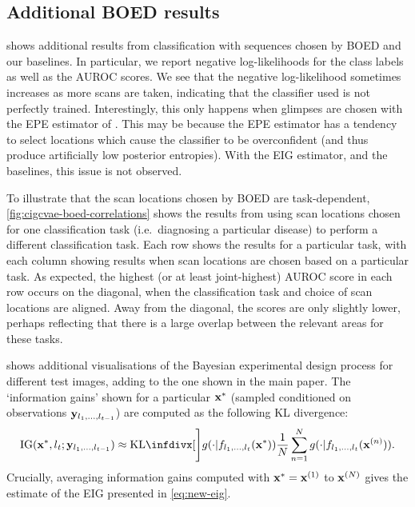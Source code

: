 \subsection{Additional BOED results} \label{supp:cigcvae-boed-results}
 shows additional results from classification with
sequences chosen by BOED and our baselines. In particular, we report negative
log-likelihoods for the class labels as well as the AUROC scores. We see that
the negative log-likelihood sometimes increases as more scans are taken,
indicating that the classifier used is not perfectly trained. Interestingly,
this only happens when glimpses are chosen with the EPE estimator of
\citet{harvey2019near}. This may be because the EPE estimator has a tendency to
select locations which cause the classifier to be overconfident (and thus
produce artificially low posterior entropies). With the EIG estimator, and the
baselines, this issue is not observed.

To illustrate that the scan locations chosen by BOED are task-dependent,
\cref{fig:cigcvae-boed-correlations} shows the results from using scan locations chosen
for one classification task (i.e.~diagnosing a particular disease) to perform a
different classification task. Each row shows the results for a particular task,
with each column showing results when scan locations are chosen based on a
particular task. As expected, the highest (or at least joint-highest) AUROC
score in each row occurs on the diagonal, when the classification task and
choice of scan locations are aligned. Away from the diagonal, the scores are
only slightly lower, perhaps reflecting that there is a large overlap between
the relevant areas for these tasks.

 shows additional visualisations of the Bayesian
experimental design process for different test images, adding to the one shown
in the main paper. The `information gains' shown for a particular ${\mathbf{x}}^*$
(sampled conditioned on observations ${\mathbf{y}}_{l{}_1,\ldots,l{}_{t-1}}$) are
computed as the following KL divergence:
\begin{align}
  \label{eq:ig}
                                                   \text{IG}(\rvx^*, \coord{}_t; \rvy_{\coord{}_1,\ldots,\coord{}_{t-1}}) \approx \kl[\Bigg]{g(\cdot|f_{\coord{}_1,\ldots,\coord{}_t}(\rvx^*))}{\frac{1}{N} \sum_{n=1}^N g(\cdot|f_{\coord{}_1,\ldots,\coord{}_t}(\rvx^{(n)}))}.
\end{align}
Crucially, averaging information gains computed with ${\mathbf{x}}^*={\mathbf{x}}^{(1)}$ to
${\mathbf{x}}^{(N)}$ gives the estimate of the EIG presented in \cref{eq:new-eig}.

